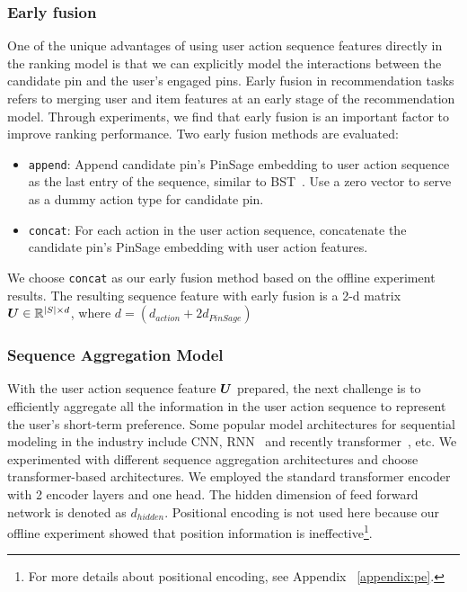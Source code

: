\subsubsection{Early fusion}
\label{sec:earlyfusion}
One of the unique advantages of using  user action sequence features directly in the ranking model is that we can explicitly model the interactions between the candidate pin and the user's engaged pins. 
Early fusion in recommendation tasks refers to merging user and item features at an early stage of the recommendation model. 
Through experiments, we find that early fusion is an important factor to improve ranking performance. Two early fusion methods are evaluated:
\begin{itemize}
\item \texttt{append}: Append candidate pin's PinSage embedding to user action sequence as the last entry of the sequence, similar to BST~\cite{alibaba_seq_tfmr}. Use a zero vector to serve as a dummy action type for candidate pin.
\item \texttt{concat}: For each action in the user action sequence, concatenate the candidate pin's PinSage embedding with user action features.
\end{itemize}
We choose  \texttt{concat}  as our early fusion method based on the offline experiment results. The resulting sequence feature with early fusion is a 2-d matrix $\boldsymbol{U} \in \mathbb{R} ^{|S| \times d}$, where $d = (d_{action} + 2d_{PinSage})$



\subsubsection{Sequence Aggregation Model}
\label{sec: seq_model}
With the user action sequence feature $\boldsymbol{U}$ prepared, the next challenge is to efficiently aggregate all the information in the user action sequence to represent the user's short-term preference. 
Some popular model architectures for sequential modeling in the industry include CNN\cite{cnn}, RNN~\cite{rnn} and recently transformer~\cite{tfmr}, etc. 
We experimented with different sequence aggregation architectures and choose transformer-based architectures. We employed the standard transformer encoder with 2 encoder layers and one head. The hidden dimension of feed forward network is denoted as $d_{hidden}$. Positional encoding is not used here because our offline experiment showed that position information is ineffective\footnote{For more details about positional encoding, see Appendix ~\ref{appendix:pe}.}.


